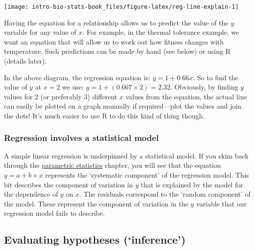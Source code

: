 \documentclass[
]{book}
\newenvironment{greybox}{
  \definecolor{shadecolor}{rgb}{0.95,0.95,0.95}  %
  \color{black}
  \begin{shaded}}
 {\end{shaded}}
\newenvironment{infobox}[1]
  {
  \begin{itemize}
  \renewcommand{\labelitemi}{
    \raisebox{-.7\height}[0pt][0pt]{
      {\setkeys{Gin}{width=3em,keepaspectratio}
        \texttt{[image: images/\#1]}}
    }
  }
  \setlength{\fboxsep}{1em}
  \begin{greybox}
  \item
  }
  {
  \end{greybox}
  \end{itemize}
  }
\begin{document}
\begin{center}\texttt{[image: intro-bio-stats-book\_files/figure-latex/reg-line-explain-1]} \end{center}

Having the equation for a relationship allows us to predict the value of the \(y\) variable for any value of \(x\). For example, in the thermal tolerance example, we want an equation that will allow us to work out how fitness changes with temperature. Such predictions can be made by hand (see below) or using R (details later).

In the above diagram, the regression equation is: \(y = 1 + 0.66 x\). So to find the value of \(y\) at \(x = 2\) we use: \(y = 1 + (0.667 \times 2) = 2.32\). Obviously, by finding \(y\) values for 2 (or preferably 3) different \(x\) values from the equation, the actual line can easily be plotted on a graph manually if required---plot the values and join the dots! It's much easier to use R to do this kind of thing though.

\begin{infobox}{information}

\hypertarget{regression-involves-a-statistical-model}{%
\subsubsection*{Regression involves a statistical model}\label{regression-involves-a-statistical-model}}

A simple linear regression is underpinned by a statistical model. If you skim back through the \protect\hyperlink{parametric-statistics}{parametric statistics} chapter, you will see that the equation \(y = a + b \times x\) represents the `systematic component' of the regression model. This bit describes the component of variation in \(y\) that is explained by the model for the dependence of \(y\) on \(x\). The residuals correspond to the `random component' of the model. These represent the component of variation in the \(y\) variable that our regression model fails to describe.

\end{infobox}

\hypertarget{evaluating-hypotheses-inference}{%
\subsection{Evaluating hypotheses (`inference')}\label{evaluating-hypotheses-inference}}
\end{document}
